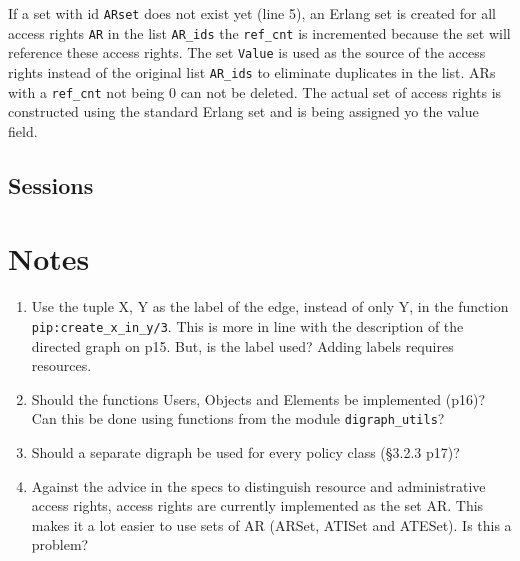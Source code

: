 \documentclass[12pt,a4paper,titlepage]{book}
\begin{document}
	If a set with id \lstinline|ARset| does not exist yet (line 5), an Erlang set is created for all access rights \lstinline|AR| in the list \lstinline|AR_ids| the \lstinline|ref_cnt| is incremented because the set will reference these access rights. The set \lstinline|Value| is used as the source of the access rights instead of the original list \lstinline|AR_ids| to eliminate duplicates in the list. ARs with a \lstinline|ref_cnt| not being 0 can not be deleted. The actual set of access rights is constructed using the standard Erlang set and is being assigned yo the value field. 
	
	
	\section{Sessions}
	
	\chapter{Notes}
	
	\begin{enumerate}

		\item Use the tuple {X, Y} as the label of the edge, instead of only Y, in the function \lstinline|pip:create_x_in_y/3|. This is more in line with the description of the directed graph on p15. But, is the label used? Adding labels requires resources.
		
		\item Should the functions Users, Objects and Elements be implemented (p16)? Can this be done using functions from the module \lstinline|digraph_utils|?
		
		\item Should a separate digraph be used for every policy class (\S 3.2.3 p17)?
		
		\item Against the advice in the specs to distinguish resource and administrative access rights, access rights are currently implemented as the set AR. This makes it a lot easier to use sets of AR (ARSet, ATISet and ATESet). Is this a problem?
		
		

	\end{enumerate}
	
	
	
\end{document}
